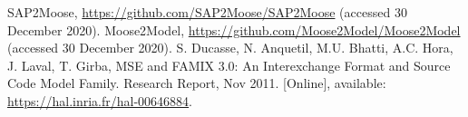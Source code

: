 \documentclass[preprint,12pt]{elsarticle}
\begin{document}
\begin{thebibliography}{00}

SAP2Moose, \url{https://github.com/SAP2Moose/SAP2Moose} (accessed 30 December 2020).
Moose2Model, \url{https://github.com/Moose2Model/Moose2Model} (accessed 30 December 2020).
%
S. Ducasse, N. Anquetil, M.U. Bhatti, A.C. Hora, J. Laval, T. Girba, MSE and FAMIX 3.0: An Interexchange Format and Source Code Model Family. Research Report, Nov 2011. [Online], available: \url{https://hal.inria.fr/hal-00646884}.

%
%
%
%

\end{thebibliography}
\end{document}

